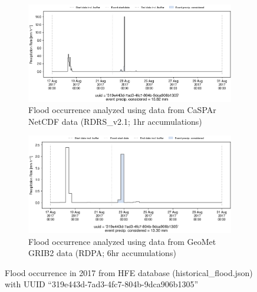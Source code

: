 \documentclass[10pt,a4paper,titlepage,parskip]{scrartcl}
\begin{document}
\begin{figure}[h]
	\begin{subfigure}[a]{1.0\textwidth}
		\centering
		\includegraphics[width=\linewidth]{figures/compare_Geomet_CaSPAr/interpolated_at_stations_occurrence_1036_identified-timesteps_RDRS_v2.1.png}
		\caption{Flood occurrence analyzed using data from CaSPAr NetCDF data (RDRS\_v2.1; 1hr accumulations)}
	\end{subfigure}
	\par\bigskip\bigskip
	\begin{subfigure}[b]{1.0\textwidth}
		\centering
		\includegraphics[width=\linewidth]{figures/compare_Geomet_CaSPAr/interpolated_at_stations_occurrence_1036_identified-timesteps_rdpa_10km_6f.png}
		\caption{Flood occurrence analyzed using data from GeoMet GRIB2 data (RDPA; 6hr accumulations)}
	\end{subfigure}
	\par\bigskip\bigskip
	\caption{Flood occurrence in 2017 from HFE database (historical\_flood.json) with UUID ``319e443d-7ad3-4fc7-804b-9dca906b1305''}
\end{figure}
\pagebreak
\end{document}
